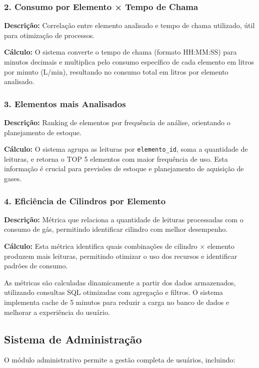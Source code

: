 \documentclass[12pt,a4paper]{article}
\begin{document}
\subsubsection{2. Consumo por Elemento × Tempo de Chama}

\textbf{Descrição:} Correlação entre elemento analisado e tempo de chama utilizado, útil para otimização de processos.

\textbf{Cálculo:} O sistema converte o tempo de chama (formato HH:MM:SS) para minutos decimais e multiplica pelo consumo específico de cada elemento em litros por minuto (L/min), resultando no consumo total em litros por elemento analisado.

\subsubsection{3. Elementos mais Analisados}

\textbf{Descrição:} Ranking de elementos por frequência de análise, orientando o planejamento de estoque.

\textbf{Cálculo:} O sistema agrupa as leituras por \texttt{elemento\_id}, soma a quantidade de leituras, e retorna o TOP 5 elementos com maior frequência de uso. Esta informação é crucial para previsões de estoque e planejamento de aquisição de gases.

\subsubsection{4. Eficiência de Cilindros por Elemento}

\textbf{Descrição:} Métrica que relaciona a quantidade de leituras processadas com o consumo de gás, permitindo identificar cilindro com melhor desempenho.

\textbf{Cálculo:} Esta métrica identifica quais combinações de cilindro × elemento produzem mais leituras, permitindo otimizar o uso dos recursos e identificar padrões de consumo.

As métricas são calculadas dinamicamente a partir dos dados armazenados, utilizando consultas SQL otimizadas com agregação e filtros. O sistema implementa cache de 5 minutos para reduzir a carga no banco de dados e melhorar a experiência do usuário.

\subsection{Sistema de Administração}

O módulo administrativo permite a gestão completa de usuários, incluindo:
\end{document}
